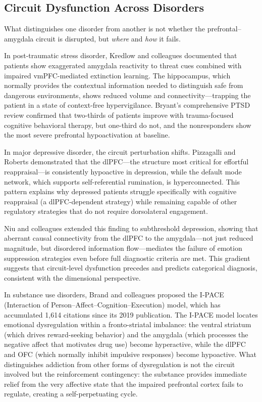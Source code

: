 \subsection*{Circuit Dysfunction Across Disorders}

What distinguishes one disorder from another is not whether the
prefrontal--amygdala circuit is disrupted, but \textit{where} and \textit{how} it
fails.

In post-traumatic stress disorder, Kredlow and colleagues documented that
patients show exaggerated amygdala reactivity to threat cues combined with
impaired vmPFC-mediated extinction learning.  The hippocampus, which
normally provides the contextual information needed to distinguish safe from
dangerous environments, shows reduced volume and connectivity---trapping the
patient in a state of context-free hypervigilance.  Bryant's comprehensive PTSD
review confirmed that two-thirds of patients improve with trauma-focused cognitive
behavioral therapy, but one-third do not, and the nonresponders show the most
severe prefrontal hypoactivation at baseline.

In major depressive disorder, the circuit perturbation shifts.  Pizzagalli and
Roberts demonstrated that the dlPFC---the structure most critical for effortful
reappraisal---is consistently hypoactive in depression, while the default mode
network, which supports self-referential rumination, is hyperconnected.
This pattern explains why depressed patients struggle specifically with cognitive
reappraisal (a dlPFC-dependent strategy) while remaining capable of other
regulatory strategies that do not require dorsolateral engagement.

Niu and colleagues extended this finding to subthreshold depression, showing that
aberrant causal connectivity from the dlPFC to the amygdala---not just reduced
magnitude, but disordered information flow---mediates the failure of emotion
suppression strategies even before full diagnostic criteria are met.
This gradient suggests that circuit-level dysfunction precedes and predicts
categorical diagnosis, consistent with the dimensional perspective.

In substance use disorders, Brand and colleagues proposed the I-PACE
(Interaction of Person--Affect--Cognition--Execution) model, which has
accumulated 1,614 citations since its 2019 publication.  The I-PACE model
locates emotional dysregulation within a fronto-striatal imbalance: the ventral
striatum (which drives reward-seeking behavior) and the amygdala (which
processes the negative affect that motivates drug use) become hyperactive, while
the dlPFC and OFC (which normally inhibit impulsive responses) become hypoactive.
What distinguishes addiction from other forms of dysregulation is not the
circuit involved but the reinforcement contingency: the substance provides
immediate relief from the very affective state that the impaired prefrontal
cortex fails to regulate, creating a self-perpetuating cycle.

